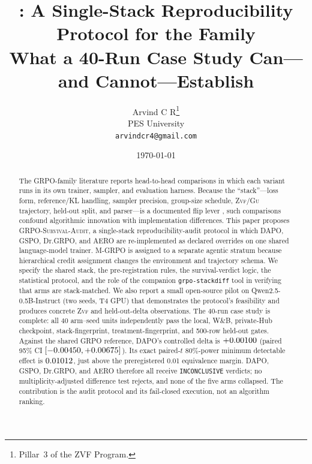 \documentclass[11pt]{article}
\title{\audit{}: A Single-Stack Reproducibility Protocol for the \grpo{} Family\\
\large What a 40-Run Case Study Can---and Cannot---Establish}
\author{Arvind C R\thanks{Pillar~3 of the ZVF Program.}\\
PES University\\\texttt{arvindcr4@gmail.com}}
\date{\today}
\newcommand{\zvf}{\textsc{Zvf}}
\newcommand{\gu}{\textsc{Gu}}
\newcommand{\grpo}{\textsc{GRPO}}
\newcommand{\audit}{\textsc{GRPO-Survival-Audit}}
\begin{document}
\maketitle

\begin{abstract}
The \grpo{}-family literature reports head-to-head comparisons in which each
variant runs in its own trainer, sampler, and evaluation harness. Because the
``stack''---loss form, reference/KL handling, sampler precision, group-size
schedule, \zvf/\gu{} trajectory, held-out split, and parser---is a documented
flip lever \cite{minreportrl2026}, such comparisons confound algorithmic
innovation with implementation differences. This paper proposes \audit{}, a
single-stack reproducibility-audit protocol in which DAPO, GSPO, Dr.\grpo{},
and AERO are re-implemented as declared overrides on one shared language-model
trainer. M-\grpo{} is assigned to a separate agentic stratum because
hierarchical credit assignment changes the environment and trajectory schema.
We specify the shared
stack, the pre-registration rules, the survival-verdict logic, the statistical
protocol, and the role of the companion \texttt{grpo-stackdiff} tool in
verifying that arms are stack-matched. We also report a small open-source pilot
on Qwen2.5-0.5B-Instruct (two seeds, T4 GPU) that demonstrates the protocol's
feasibility and produces concrete \zvf{} and held-out-delta observations. The
40-run case study is complete: all 40 arm--seed units independently pass
the local, W\&B, private-Hub checkpoint, stack-fingerprint,
treatment-fingerprint, and 500-row held-out gates. Against the shared GRPO
reference, DAPO's controlled delta is $+0.00100$ (paired 95\% CI
$[-0.00450,+0.00675]$). Its exact paired-$t$ 80\%-power
minimum detectable effect is $0.01012$, just above the preregistered
0.01 equivalence margin. DAPO, GSPO, Dr.\grpo{}, and AERO therefore all receive
\texttt{INCONCLUSIVE} verdicts; no multiplicity-adjusted difference test
rejects, and none of the five arms collapsed. The contribution is the audit
protocol and its fail-closed execution, not an algorithm ranking.
\end{abstract}
\end{document}
